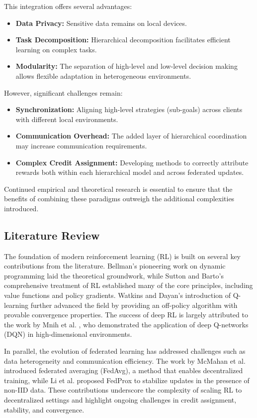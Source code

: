 \documentclass[12pt,a4paper,twoside,openany]{book}
\begin{document}
This integration offers several advantages:
\begin{itemize}
    \item \textbf{Data Privacy:} Sensitive data remains on local devices.
    \item \textbf{Task Decomposition:} Hierarchical decomposition facilitates efficient learning on complex tasks.
    \item \textbf{Modularity:} The separation of high-level and low-level decision making allows flexible adaptation in heterogeneous environments.
\end{itemize}

However, significant challenges remain:
\begin{itemize}
    \item \textbf{Synchronization:} Aligning high-level strategies (sub-goals) across clients with different local environments.
    \item \textbf{Communication Overhead:} The added layer of hierarchical coordination may increase communication requirements.
    \item \textbf{Complex Credit Assignment:} Developing methods to correctly attribute rewards both within each hierarchical model and across federated updates.
\end{itemize}

Continued empirical and theoretical research is essential to ensure that the benefits of combining these paradigms outweigh the additional complexities introduced.

\subsection*{Literature Review}
The foundation of modern reinforcement learning (RL) is built on several key contributions from the literature. Bellman's pioneering work on dynamic programming \cite{Bellman1957} laid the theoretical groundwork, while Sutton and Barto's comprehensive treatment of RL \cite{Sutton2000} established many of the core principles, including value functions and policy gradients. Watkins and Dayan's introduction of Q-learning \cite{Watkins1992} further advanced the field by providing an off-policy algorithm with provable convergence properties. The success of deep RL is largely attributed to the work by Mnih et al. \cite{Mnih2015}, who demonstrated the application of deep Q-networks (DQN) in high-dimensional environments.

In parallel, the evolution of federated learning has addressed challenges such as data heterogeneity and communication efficiency. The work by McMahan et al. \cite{McMahan2016} introduced federated averaging (FedAvg), a method that enables decentralized training, while Li et al. \cite{Li2020} proposed FedProx to stabilize updates in the presence of non-IID data. These contributions underscore the complexity of scaling RL to decentralized settings and highlight ongoing challenges in credit assignment, stability, and convergence.
\end{document}
